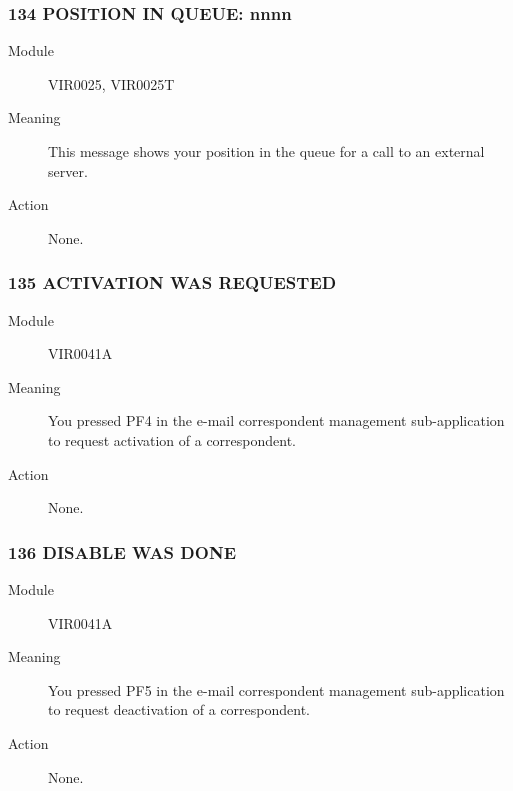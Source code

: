 \documentclass[letterpaper,10pt,english]{sphinxmanual}
\begin{document}
\subsubsection{134 POSITION IN QUEUE: nnnn}
\label{\detokenize{messages:position-in-queue-nnnn}}\begin{description}
\item[{Module}] \leavevmode
VIR0025, VIR0025T

\item[{Meaning}] \leavevmode
This message shows your position in the queue for a call to an external server.

\item[{Action}] \leavevmode
None.

\end{description}


\subsubsection{135 ACTIVATION WAS REQUESTED}
\label{\detokenize{messages:activation-was-requested}}\begin{description}
\item[{Module}] \leavevmode
VIR0041A

\item[{Meaning}] \leavevmode
You pressed PF4 in the e-mail correspondent management sub-application to request activation of a correspondent.

\item[{Action}] \leavevmode
None.

\end{description}


\subsubsection{136 DISABLE WAS DONE}
\label{\detokenize{messages:disable-was-done}}\begin{description}
\item[{Module}] \leavevmode
VIR0041A

\item[{Meaning}] \leavevmode
You pressed PF5 in the e-mail correspondent management sub-application to request deactivation of a correspondent.

\item[{Action}] \leavevmode
None.

\end{description}
\end{document}
